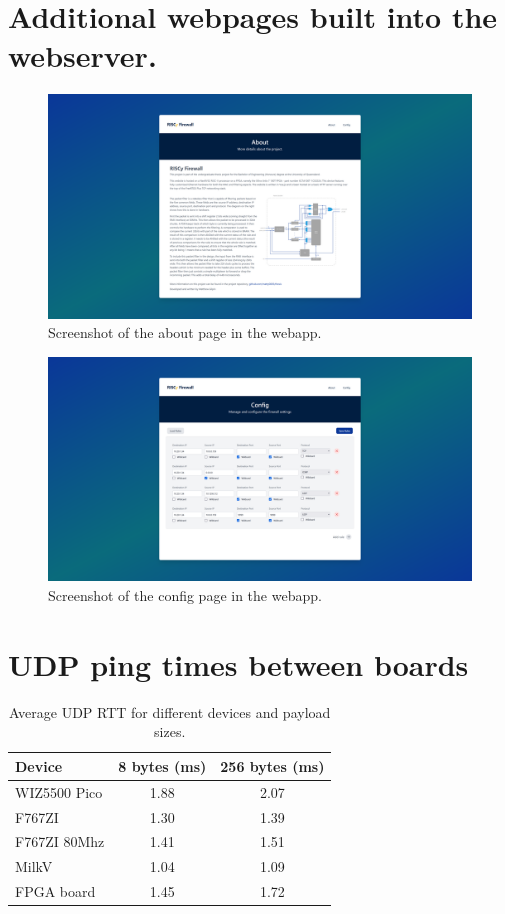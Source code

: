 \section{Additional webpages built into the webserver.}
\label{app:additional_webpages}
\begin{figure}[h!]
    \centering
    \includegraphics[width=1\textwidth]{Images/webapp_about.png}
    \caption{Screenshot of the about page in the webapp.}
    \label{fig:web_app_about}
\end{figure}

\begin{figure}[h!]
    \centering
    \includegraphics[width=1\textwidth]{Images/webapp_config.png}
    \caption{Screenshot of the config page in the webapp.}
    \label{fig:web_app_config}
\end{figure}


\section{UDP ping times between boards}
\label{app:udp_ping_measurements}
\begin{table}[ht]
    \centering
    \caption{Average UDP RTT for different devices and payload sizes.}
    \begin{tabular}{lcc}
    \toprule
    Device & 8 bytes (ms) & 256 bytes (ms) \\
    \midrule
    WIZ5500 Pico & 1.88 & 2.07 \\
    F767ZI & 1.30 & 1.39 \\
    F767ZI 80Mhz & 1.41 & 1.51 \\
    MilkV & 1.04 & 1.09 \\
    FPGA board & 1.45 & 1.72 \\
    \bottomrule
    \end{tabular}
    \end{table}

